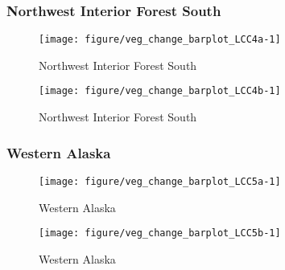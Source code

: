 \documentclass{article}\usepackage[]{graphicx}\usepackage[]{color}
\makeatletter
\def\maxwidth{ %
  \ifdim\Gin@nat@width>\linewidth
    \linewidth
  \else
    \Gin@nat@width
  \fi
}
\makeatother
\begin{document}
\subsubsection{Northwest Interior Forest South}
\begin{figure}[H]
\texttt{[image: figure/veg\_change\_barplot\_LCC4a-1]} \caption[Northwest Interior Forest South]{Northwest Interior Forest South\label{fig:veg_change_barplot_LCC4a}}
\end{figure}


\begin{figure}[H]
\texttt{[image: figure/veg\_change\_barplot\_LCC4b-1]} \caption[Northwest Interior Forest South]{Northwest Interior Forest South\label{fig:veg_change_barplot_LCC4b}}
\end{figure}



\subsubsection{Western Alaska}
\begin{figure}[H]
\texttt{[image: figure/veg\_change\_barplot\_LCC5a-1]} \caption[Western Alaska]{Western Alaska\label{fig:veg_change_barplot_LCC5a}}
\end{figure}


\begin{figure}[H]
\texttt{[image: figure/veg\_change\_barplot\_LCC5b-1]} \caption[Western Alaska]{Western Alaska\label{fig:veg_change_barplot_LCC5b}}
\end{figure}
\end{document}
